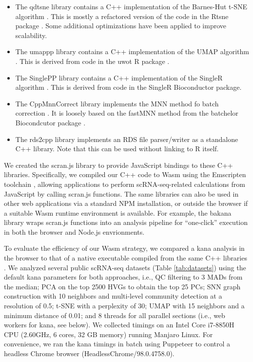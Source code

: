 \documentclass{article}
\begin{document}
\begin{itemize}
\item The qdtsne library \cite{qdtsne} contains a C++ implementation of the Barnes-Hut t-SNE algorithm \cite{maaten2014accelerating}.
This is mostly a refactored version of the code in the Rtsne package \cite{rtsne}.
Some additional optimizations have been applied to improve scalability.
\item The umappp library \cite{umappp} contains a C++ implementation of the UMAP algorithm \cite{mcinnes2018umap}.
This is derived from code in the uwot R package \cite{uwot}.
\item The SinglePP library \cite {singlepp} contains a C++ implementation of the SingleR algorithm \cite{aran2019reference}.
This is derived from code in the SingleR Bioconductor package. 
\item The CppMnnCorrect library \cite{cppmnncorrect} implements the MNN method fo batch correction \cite{haghverdi2018batch}.
It is loosely based on the fastMNN method from the batchelor Biocondcutor package \cite{batchelorbioc}.
\item The rds2cpp library \cite{rds2cpp} implements an RDS file parser/writer as a standalone C++ library.
Note that this can be used without linking to R itself. 
\end{itemize}

We created the scran.js library \cite{scran.js} to provide JavaScript bindings to these C++ libraries.
Specifically, we compiled our C++ code to Wasm using the Emscripten toolchain \cite{zakai2011emscripten},
allowing applications to perform scRNA-seq-related calculations from JavaScript by calling scran.js functions. 
The same libraries can also be used in other web applications via a standard NPM installation, 
or outside the browser if a suitable Wasm runtime environment is available.
For example, the bakana library wraps scran.js functions into an analysis pipeline for ``one-click'' execution in both the browser and Node.js envrionments.

To evaluate the efficiency of our Wasm strategy, 
we compared a kana analysis in the browser to that of a native executable compiled from the same C++ libraries \cite{scrancli}.
We analyzed several public scRNA-seq datasets (Table \ref{tab:datasets}) using the default kana parameters for both approaches, i.e.,
QC filtering to 3 MADs from the median;
PCA on the top 2500 HVGs to obtain the top 25 PCs;
SNN graph construction with 10 neighbors and multi-level community detection at a resolution of 0.5;
t-SNE with a perplexity of 30;
UMAP with 15 neighbors and a minimum distance of 0.01;
and 8 threads for all parallel sections (i.e., web workers for kana, see below).
We collected timings on an Intel Core i7-8850H CPU (2.60GHz, 6 cores, 32 GB memory) running Manjaro Linux.
For convenience, we ran the kana timings in batch using Puppeteer \cite{puppeteer} to control a headless Chrome browser (HeadlessChrome/98.0.4758.0). 
\end{document}
